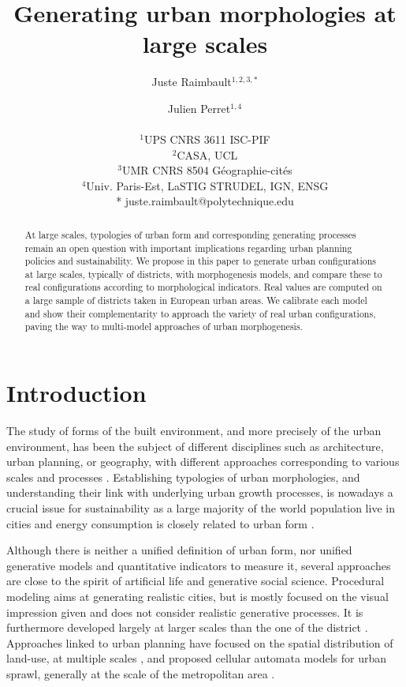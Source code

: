 \documentclass[letterpaper]{article}
\title{Generating urban morphologies at large scales}
\author{Juste Raimbault$^{1,2,3,*}$ \and Julien Perret$^{1,4}$ \\
\mbox{}\\
$^1$UPS CNRS 3611 ISC-PIF\\
$^2$CASA, UCL\\
$^3$UMR CNRS 8504 G{\'e}ographie-cit{\'e}s\\
$^4$Univ. Paris-Est, LaSTIG STRUDEL, IGN, ENSG\\\medskip
* juste.raimbault@polytechnique.edu} %
\begin{document}
\maketitle

\begin{abstract}
  At large scales, typologies of urban form and corresponding generating processes remain an open question with important implications regarding urban planning policies and sustainability. We propose in this paper to generate urban configurations at large scales, typically of districts, with morphogenesis models, and compare these to real configurations according to morphological indicators. Real values are computed on a large sample of districts taken in European urban areas. We calibrate each model and show their complementarity to approach the variety of real urban configurations, paving the way to multi-model approaches of urban morphogenesis.
\end{abstract}


\section{Introduction}


The study of forms of the built environment, and more precisely of the urban environment, has been the subject of different disciplines such as architecture, urban planning, or geography, with different approaches corresponding to various scales and processes \citep{moudon1997urban}. Establishing typologies of urban morphologies, and understanding their link with underlying urban growth processes, is nowadays a crucial issue for sustainability as a large majority of the world population live in cities and energy consumption is closely related to urban form \citep{newman2000sustainable}.


Although there is neither a unified definition of urban form, nor unified generative models and quantitative indicators to measure it, several approaches are close to the spirit of artificial life and generative social science. Procedural modeling \citep{watson2008procedural} aims at generating realistic cities, but is mostly focused on the visual impression given and does not consider realistic generative processes. It is furthermore developed largely at larger scales than the one of the district \citep{}. Approaches linked to urban planning have focused on the spatial distribution of land-use, at multiple scales \citep{}, and proposed cellular automata models for urban sprawl, generally at the scale of the metropolitan area \cite{herold2003spatiotemporal}.
\end{document}
